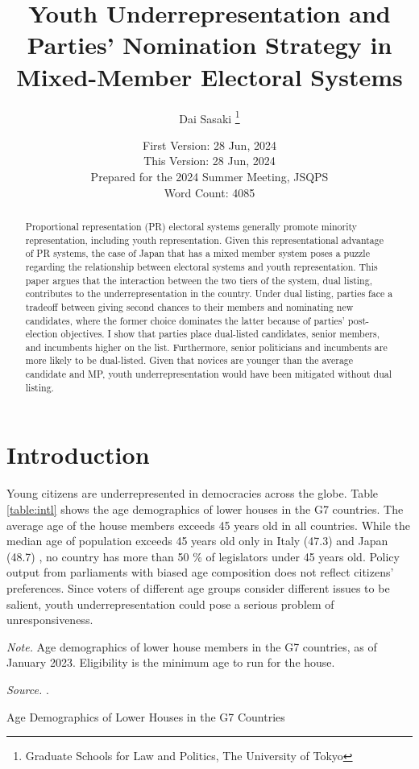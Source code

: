 \documentclass[a4paper, 11pt]{article}
\title{Youth Underrepresentation and Parties' Nomination Strategy in Mixed-Member Electoral Systems}
\author{Dai Sasaki \thanks{Graduate Schools for Law and Politics, The University of Tokyo}}
\date{
	First Version: 28 Jun, 2024 \\
	This Version: 28 Jun, 2024 \\
	Prepared for the 2024 Summer Meeting, JSQPS \\
	Word Count: 4085
}
\begin{document}
\maketitle

\begin{abstract}  %
Proportional representation (PR) electoral systems generally promote minority representation, including youth representation. Given this representational advantage of PR systems, the case of Japan that has a mixed member system poses a puzzle regarding the relationship between electoral systems and youth representation. This paper argues that the interaction between the two tiers of the system, dual listing, contributes to the underrepresentation in the country. Under dual listing, parties face a tradeoff between giving second chances to their members and nominating new candidates, where the former choice dominates the latter because of parties' post-election objectives. I show that parties place dual-listed candidates, senior members, and incumbents higher on the list. Furthermore, senior politicians and incumbents are more likely to be dual-listed. Given that novices are younger than the average candidate and MP, youth underrepresentation would have been mitigated without dual listing. 
\end{abstract}

\newpage

\section{Introduction}

Young citizens are underrepresented in democracies across the globe. Table \ref{table:intl} shows the age demographics of lower houses in the G7 countries. The average age of the house members exceeds 45 years old in all countries. While the median age of population exceeds 45 years old only in Italy (47.3) and Japan (48.7) \citep{un2022}, no country has more than 50 \% of legislators under 45 years old. Policy output from parliaments with biased age composition does not reflect citizens' preferences. Since voters of different age groups consider different issues to be salient, youth underrepresentation could pose a serious problem of unresponsiveness. 

\begin{table}[htbp]
\begin{center}
\begin{threeparttable}

\begin{tablenotes}[flushleft]
  \scriptsize{
    \item{\textit{Note.} Age demographics of lower house members in the G7 countries, as of January 2023. Eligibility is the minimum age to run for the house.}
    \item{\textit{Source.} \citet{ipu2023}.}
  }
\end{tablenotes}
\end{threeparttable}
\caption{Age Demographics of Lower Houses in the G7 Countries}
\label{table:intl}
\end{center}
\end{table}
\end{document}
